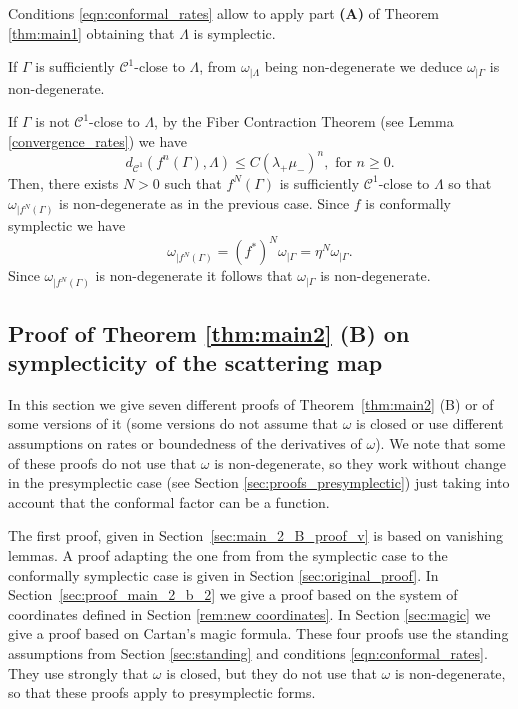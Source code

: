 \documentclass[11pt]{amsart}
\theoremstyle{definition}
\theoremstyle{remark}
\numberwithin{equation}{section}
\newcommand{\C}{\mathcal{C}}
\begin{document}
Conditions \eqref{eqn:conformal_rates} allow to apply part \textbf{(A)} of Theorem \ref{thm:main1} obtaining that $\Lambda$ is symplectic.

If $\Gamma$ is sufficiently $\C^1$-close to $\Lambda$,
from $\omega_{\mid\Lambda}$ being non-degenerate we deduce
$\omega_{\mid\Gamma}$ is non-degenerate.

If $\Gamma$ is not  $\C^1$-close to $\Lambda$, by the Fiber Contraction Theorem  (see Lemma \ref{convergence_rates})  we have
\begin{equation}\label{eqn:lambdalemma}
  d_{\C^1}(f^n(\Gamma),\Lambda)\leq C   (\lambda_+\mu_-)^{n}, \textrm { for } n\geq 0.
\end{equation}
Then, there exists $N>0$ such that $f^N(\Gamma)$ is sufficiently $\C^1$-close to $\Lambda$
so that
$\omega_{\mid f^N(\Gamma)}$ is non-degenerate as in  the previous case.
Since $f$ is conformally symplectic we have
\[
\omega_{\mid f^N(\Gamma)}=(f^*)^N\omega_{\mid\Gamma}=\eta^N \omega_{\mid\Gamma}.
\]
Since $\omega_{\mid f^N(\Gamma)}$ is non-degenerate it follows that $\omega_{\mid  \Gamma}$ is non-degenerate.




\subsection{Proof of Theorem \ref{thm:main2}  (B) on symplecticity of the scattering map}\label{sec:proof_main_2_b}

In this section we give seven different proofs of Theorem~\ref{thm:main2}  (B)  or of some  versions of it
(some versions do not assume that $\omega$ is closed or use  different assumptions on rates or boundedness
of the derivatives of $\omega$).
We note that some of these proofs do not use that $\omega$ is non-degenerate, so they work without change in  the presymplectic case (see Section \ref{sec:proofs_presymplectic}) just taking into account that the conformal factor can be a function.

The first proof, given in Section~\ref{sec:main_2_B_proof_v} is based on vanishing lemmas.
A proof  adapting the  one from \cite{DLS08} from the symplectic case to the conformally symplectic case  is given in Section \ref{sec:original_proof}.
In Section~\ref{sec:proof_main_2_b_2} we give a proof based on the system of coordinates defined in Section \ref{rem:new coordinates}.
In Section \ref{sec:magic} we give a proof based on Cartan's magic formula.
These four proofs use the standing assumptions from Section
\ref{sec:standing} and conditions \eqref{eqn:conformal_rates}.
They use strongly that $\omega$ is closed, but they do
not use that $\omega$ is non-degenerate, so that these proofs
apply to presymplectic forms.
\end{document}
